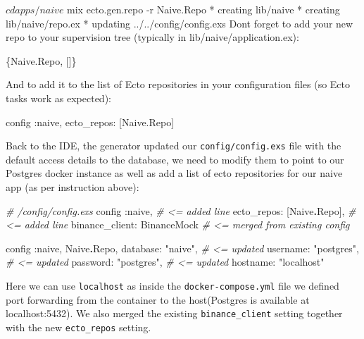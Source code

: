 \documentclass[
]{book}
\newenvironment{Shaded}{\begin{snugshade}}{\end{snugshade}}
\newcommand{\AttributeTok}[1]{\textcolor[rgb]{0.77,0.63,0.00}{#1}}
\newcommand{\CommentTok}[1]{\textcolor[rgb]{0.56,0.35,0.01}{\textit{#1}}}
\newcommand{\ConstantTok}[1]{\textcolor[rgb]{0.00,0.00,0.00}{#1}}
\newcommand{\ExtensionTok}[1]{#1}
\newcommand{\NormalTok}[1]{#1}
\newcommand{\OperatorTok}[1]{\textcolor[rgb]{0.81,0.36,0.00}{\textbf{#1}}}
\newcommand{\StringTok}[1]{\textcolor[rgb]{0.31,0.60,0.02}{#1}}
\newcommand{\VariableTok}[1]{\textcolor[rgb]{0.00,0.00,0.00}{#1}}
\begin{document}
\begin{Shaded}
\begin{Highlighting}[]
\ExtensionTok{$}\NormalTok{ cd apps/naive}
\ExtensionTok{$}\NormalTok{ mix ecto.gen.repo }\AttributeTok{{-}r}\NormalTok{ Naive.Repo}
\ExtensionTok{*}\NormalTok{ creating lib/naive}
\ExtensionTok{*}\NormalTok{ creating lib/naive/repo.ex}
\ExtensionTok{*}\NormalTok{ updating ../../config/config.exs}
\ExtensionTok{Don}\StringTok{\textquotesingle{}t forget to add your new repo to your supervision tree}
\StringTok{(typically in lib/naive/application.ex):}

\StringTok{    \{Naive.Repo, []\}}

\StringTok{And to add it to the list of Ecto repositories in your}
\StringTok{configuration files (so Ecto tasks work as expected):}

\StringTok{    config :naive,}
\StringTok{      ecto\_repos: [Naive.Repo]}
\end{Highlighting}
\end{Shaded}

Back to the IDE, the generator updated our \texttt{config/config.exs} file with the default access details to the database, we need to modify them to point to our Postgres docker instance as well as add a list of ecto repositories for our naive app (as per instruction above):

\begin{Shaded}
\begin{Highlighting}[]
\CommentTok{\# /config/config.exs}
\NormalTok{config }\VariableTok{:naive}\NormalTok{,                }\CommentTok{\# \textless{}= added line}
  \VariableTok{ecto\_repos:}\NormalTok{ [}\ConstantTok{Naive}\OperatorTok{.}\ConstantTok{Repo}\NormalTok{],   }\CommentTok{\# \textless{}= added line}
  \VariableTok{binance\_client:} \ConstantTok{BinanceMock} \CommentTok{\# \textless{}= merged from existing config}

\NormalTok{config }\VariableTok{:naive}\NormalTok{, }\ConstantTok{Naive}\OperatorTok{.}\ConstantTok{Repo}\NormalTok{,}
  \VariableTok{database:} \StringTok{"naive"}\NormalTok{,    }\CommentTok{\# \textless{}= updated}
  \VariableTok{username:} \StringTok{"postgres"}\NormalTok{, }\CommentTok{\# \textless{}= updated}
  \VariableTok{password:} \StringTok{"postgres"}\NormalTok{, }\CommentTok{\# \textless{}= updated}
  \VariableTok{hostname:} \StringTok{"localhost"}
\end{Highlighting}
\end{Shaded}

Here we can use \texttt{localhost} as inside the \texttt{docker-compose.yml} file we defined port forwarding from the container to the host(Postgres is available at localhost:5432). We also merged the existing \texttt{binance\_client} setting together with the new \texttt{ecto\_repos} setting.
\end{document}
